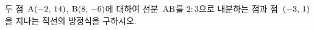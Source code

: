 두 점~$\mathrm{A}(-2,\mkern3mu 14)$, $\mathrm{B}(8,\mkern3mu -6)$에 대하여 선분~$\mathrm{AB}$를 $2:3$으로 내분하는 점과 점~$(-3,\mkern3mu 1)$을 지나는 직선의 방정식을 구하시오.

